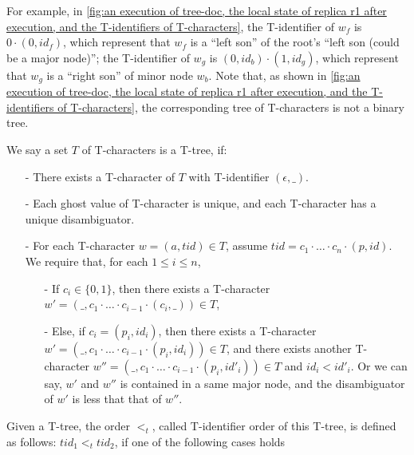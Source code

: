 For example, in \autoref{fig:an execution of tree-doc, the local state of replica r1 after execution, and the T-identifiers of T-characters}, the T-identifier of $w_f$ is $0 \cdot (0,id_f)$, which represent that $w_f$ is a ``left son'' of the root's ``left son (could be a major node)''; the T-identifier of $w_g$ is $(0,id_b) \cdot (1,id_g)$, which represent that $w_g$ is a ``right son'' of minor node $w_b$. Note that, as shown in \autoref{fig:an execution of tree-doc, the local state of replica r1 after execution, and the T-identifiers of T-characters}, the corresponding tree of T-characters is not a binary tree.

We say a set $T$ of T-characters is a T-tree, if:

\begin{itemize}
\setlength{\itemsep}{0.5pt}
\item[-] There exists a T-character of $T$ with T-identifier $(\epsilon,\_)$.

\item[-] Each ghost value of T-character is unique, and each T-character has a unique disambiguator.

\item[-] For each T-character $w=(a,tid) \in T$, assume $tid = c_1 \cdot \ldots \cdot c_n \cdot (p,id)$. We require that, for each $1 \leq i \leq n$,

    \begin{itemize}
    \setlength{\itemsep}{0.5pt}
    \item[-] If $c_i \in \{ 0,1 \}$, then there exists a T-character $w' = (\_, c_1 \cdot \ldots \cdot c_{i-1} \cdot (c_i,\_) ) \in T$,

    \item[-] Else, if $c_i = (p_i,id_i)$, then there exists a T-character $w' = (\_, c_1 \cdot \ldots \cdot c_{i-1} \cdot (p_i,id_i) ) \in T$, and there exists another T-character $w'' = (\_, c_1 \cdot \ldots \cdot c_{i-1} \cdot (p_i,id'_i) ) \in T$ and $id_i < id'_i$. Or we can say, $w'$ and $w''$ is contained in a same major node, and the disambiguator of $w'$ is less that that of $w''$.
    \end{itemize}
\end{itemize}

Given a T-tree, the order $<_t$, called T-identifier order of this T-tree, is defined as follows: $tid_1 <_t tid_2$, if one of the following cases holds

